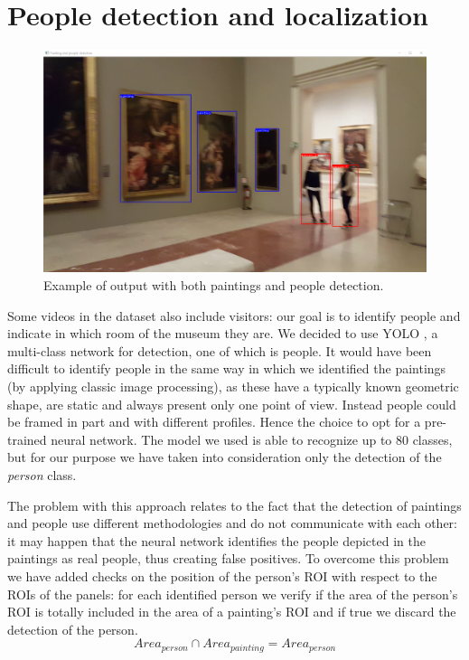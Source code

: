 \documentclass[10pt,twocolumn,letterpaper]{article}
\begin{document}
\section{People detection and localization}
\label{sec:PeopleDetectionAndLocalization}

\begin{figure}[t]
\begin{center}
\includegraphics[width=0.8\linewidth]{images/image3.png}
\end{center}
\caption{Example of output with both paintings and people detection.}
\label{fig:PeopleDetection}
\end{figure}

Some videos in the dataset also include visitors: our goal is to identify people and indicate in which room of the museum they are. We decided to use YOLO \cite{redmon2015unified}, a multi-class network for detection, one of which is people. It would have been difficult to identify people in the same way in which we identified the paintings (by applying classic image processing), as these have a typically known geometric shape, are static and always present only one point of view. Instead people could be framed in part and with different profiles. Hence the choice to opt for a pre-trained neural network. The model we used is able to recognize up to 80 classes, but for our purpose we have taken into consideration only the detection of the \textit{person} class.

The problem with this approach relates to the fact that the detection of paintings and people use different methodologies and do not communicate with each other: it may happen that the neural network identifies the people depicted in the paintings as real people, thus creating false positives. To overcome this problem we have added checks on the position of the person's ROI with respect to the ROIs of the panels: for each identified person we verify if the area of the person's ROI is totally included in the area of a painting's ROI and if true we discard the detection of the person.
\begin{equation}
\label{eq:DiscardPerson}
Area_{person} \cap Area_{painting} = Area_{person}
\end{equation}
\end{document}
